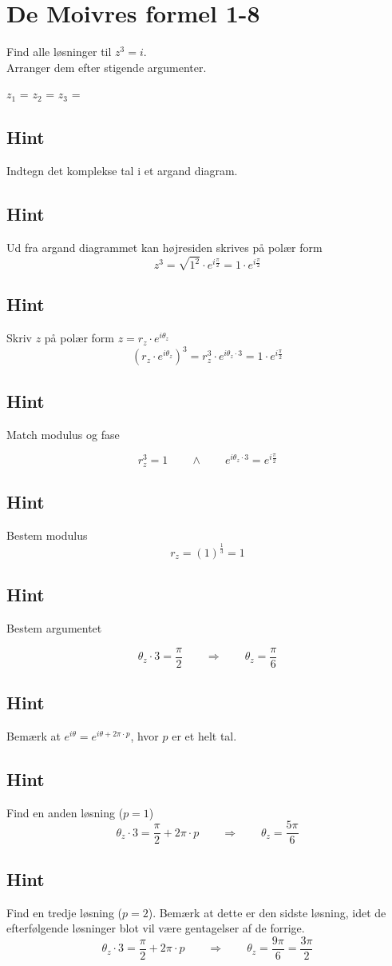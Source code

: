 \documentclass{article}
\newenvironment{exercise}[1]{\newpage\section{#1}}{}
\newcommand{\answerbox}[1]{\fbox{$#1$}}
\newcommand{\hint}{\subsection*{Hint}}
\begin{document}
\begin{exercise}{De Moivres formel 1-8}
	
	Find alle løsninger til $z^3=i$. \\
	Arranger dem efter stigende argumenter.
	
	$z_1$ = \answerbox{e^{i \frac{\pi}{6}}}		$z_2$ = \answerbox{e^{i \frac{5\pi}{6}}}		$z_3$ = \answerbox{e^{i \frac{3\pi}{2}}}		
	
	
	\hint 
	
	Indtegn det komplekse tal i et argand diagram. 
	
	\hint 
	
	Ud fra argand diagrammet kan højresiden skrives på polær form
	\[
	z^3 = \sqrt{1^2} \cdot e^{i \frac{\pi}{2}} = 1 \cdot e^{i \frac{\pi}{2}} 
	\]
	
	
	\hint
	
	Skriv $z$ på polær form $z = r_z \cdot e^{i \theta_z}$
	\[
	\left(r_z \cdot e^{i \theta_z}\right)^3 = r_z^3 \cdot e^{i \theta_z \cdot 3} = 1 \cdot e^{i \frac{\pi}{2}} 
	\]
	
	\hint 
	Match modulus og fase
	
	\[
	r_z^3 = 1 \qquad \wedge \qquad e^{i \theta_z \cdot 3} = e^{i \frac{\pi}{2}} 
	\]
	
	\hint
	
	Bestem modulus
	\[
	r_z  =  \left(1 \right)^{\frac{1}{3}} = 1
	\]
	
	\hint
	
	Bestem argumentet
	
	\[
	\theta_z \cdot 3 = \frac{\pi}{2} \qquad \Rightarrow \qquad  \theta_z = \frac{\pi}{6}
	\]
	
	\hint
	
	Bemærk at $e^{i \theta} = e^{i \theta + 2 \pi \cdot p}$, hvor $p$ er et helt tal.
	
	\hint
	
	Find en anden løsning ($p=1$)
	\[
	\theta_z \cdot 3 = \frac{\pi}{2}  + 2 \pi \cdot p \qquad \Rightarrow \qquad  \theta_z = \frac{5 \pi}{6}
	\]
	
	\hint
	
	Find en tredje løsning ($p=2$). Bemærk at dette er den sidste løsning, idet de efterfølgende løsninger blot vil være gentagelser af de forrige.
	\[
	\theta_z \cdot 3 =  \frac{\pi}{2}  + 2 \pi \cdot p \qquad \Rightarrow  \qquad  \theta_z = \frac{9 \pi}{6} = \frac{3 \pi}{2}
	\]
	
	
\end{exercise}

\newpage
\end{document}

